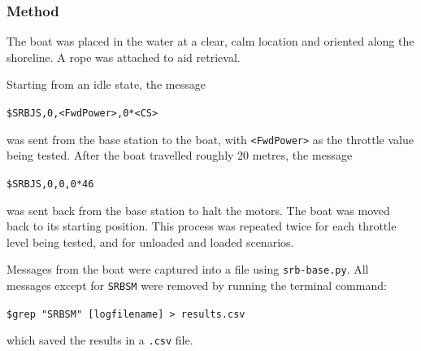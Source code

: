 \documentclass[a4paper]{IEEEtran}
\begin{document}
\subsubsection{Method}
The boat was placed in the water at a clear, calm location and oriented along the shoreline. A rope was attached to aid retrieval.

Starting from an idle state, the message
\begin{center}
\texttt{\$SRBJS,0,<FwdPower>,0*<CS>}
\end{center}
was sent from the base station to the boat, with \texttt{<FwdPower>} as the throttle value being tested. After the boat travelled roughly 20 metres, the message
\begin{center}
\texttt{\$SRBJS,0,0,0*46}
\end{center}
was sent back from the base station to halt the motors. The boat was moved back to its starting position. This process was repeated twice for each throttle level being tested, and for unloaded and loaded scenarios.

Messages from the boat were captured into a file using \texttt{srb-base.py}. All messages except for \texttt{SRBSM} were removed by running the terminal command:
\begin{center}
\texttt{\$grep "SRBSM" [logfilename] > results.csv}
\end{center}
which saved the results in a \texttt{.csv} file.


\end{document}

